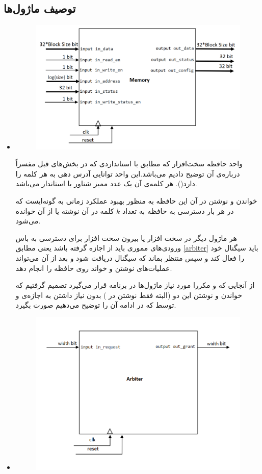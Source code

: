 \documentclass[12pt,onecolumn,a4paper,fleqn]{article}
\begin{document}
\pagebreak
	
\subsection{توصیف ماژول‌ها}

\begin{itemize}
	\item 
	
	\begin{figure}[h]
		\centering
		\includegraphics[width=0.6\linewidth]{source/Memory.png}
		\caption{}
	\end{figure}
	
	واحد حافظه سخت‌افزار که مطابق با استانداردی که در بخش‌های قبل مفسراً درباره‌ی آن توضیح دادیم می‌‌باشد.این واحد توانایی آدرس دهی به هر کلمه‌ را دارد(). هر کلمه‌ی آن یک عدد ممیز شناور با استاندار  می‌باشد.

خواندن و نوشتن در آن این حافظه به منظور بهبود عملکرد زمانی به گونه‌ایست که در هر بار دسترسی به حافظه به تعداد $k$ کلمه در آن نوشته یا از آن خوانده می‌شود.
	
	هر ماژول دیگر در سخت افزار یا بیرون سخت افزار  برای دسترسی به باس ورودی‌های مموری باید از  اجازه گرفته باشد یعنی مطابق \autoref{arbiter} باید سیگنال  خود را فعال کند و سپس منتظر بماند که سیگنال  دریافت شود و بعد از آن می‌تواند عملیات‌های نوشتن و خواند روی حافظه را انجام دهد.
	
	از آنجایی که  و  مکررا مورد نیاز ماژول‌ها در برنامه قرار می‌گیرد تصمیم گرفتیم که خواندن و نوشتن این دو (البته فقط نوشتن در ) بدون نیاز داشتن به اجازه‌ی  و توسط  که در ادامه‌ آن را توضیح می‌دهیم صورت بگیرد.
	\pagebreak
	\item 
	
	\begin{figure}[h]
		\centering
		\includegraphics[width=0.5\linewidth]{source/arbiter1.png}
		\caption{}
	\end{figure}
	

\end{itemize}
\end{document}
